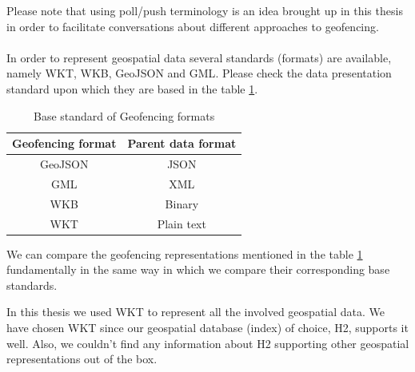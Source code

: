 \documentclass[a4]{report}
\begin{document}
    Please note that using poll/push terminology is an idea brought up in this thesis in order to facilitate
    conversations about different approaches to geofencing.

    \paragraph{}
    In order to represent geospatial data several standards (formats) are available, namely WKT\cite{WKT}, WKB\cite{wkb},
    GeoJSON\cite{geoJson} and GML\cite{gml}.
    Please check the data presentation standard upon which they are based in the table \ref{table:geofencing-formats}.

    \begin{table}[h!]
        \centering
        \begin{tabular}{|c|c|}
            \hline
            Geofencing format & Parent data format \\
            \hline
            GeoJSON           & JSON               \\
            GML               & XML                \\
            WKB               & Binary             \\
            WKT               & Plain text         \\
            \hline
        \end{tabular}
        \caption{Base standard of Geofencing formats}
        \label{table:geofencing-formats}
    \end{table}

    We can compare the geofencing representations mentioned in the table \ref{table:geofencing-formats} fundamentally
    in the same way in which we compare their corresponding base standards.

    In this thesis we used WKT to represent all the involved geospatial data.
    We have chosen WKT since our geospatial database (index) of choice, H2, supports it well.
    Also, we couldn't find any information about H2 supporting other geospatial representations out of the box.
\end{document}
